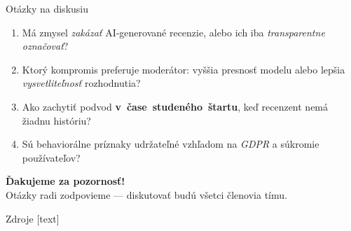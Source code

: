 \documentclass[10pt]{beamer}
\newcommand{\emp}[1]{\textit{\alert{#1}}}
\newcommand{\kw}[1]{\mbox{\textbf{#1}}}
\begin{document}
\begin{frame}{Otázky na diskusiu}
\begin{enumerate}
\item Má zmysel \emp{zakázať} AI-generované recenzie, alebo ich iba \emp{transparentne označovať}?
\item Ktorý kompromis preferuje moderátor: vyššia presnosť modelu alebo lepšia \emp{vysvetliteľnosť} rozhodnutia?
\item Ako zachytiť podvod \kw{v čase studeného štartu}, keď recenzent nemá žiadnu históriu?
\item Sú behaviorálne príznaky udržateľné vzhľadom na \emp{GDPR} a súkromie používateľov?
\end{enumerate}
\vfill
\begin{center}
{\Large \textbf{Ďakujeme za pozornosť!}}\\[1mm]
{\small Otázky radi zodpovieme --- diskutovať budú všetci členovia tímu.}
\end{center}
\end{frame}

\begin{frame}[allowframebreaks]{Zdroje}
\scriptsize
{}[text]
\nocite{*}


\end{frame}
\end{document}
